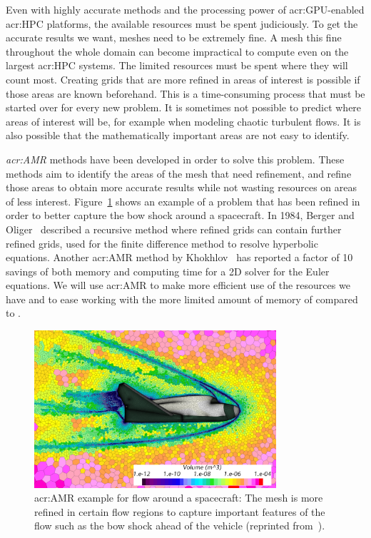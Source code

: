 Even with highly accurate methods and the processing power of \acrshort{acr:GPU}-enabled
\acrshort{acr:HPC} platforms, the available resources must be spent judiciously. To get the accurate
results we want, meshes need to be extremely fine. A mesh this fine throughout the whole domain can
become impractical to compute even on the largest \acrshort{acr:HPC} systems. The limited resources
must be spent where they will count most. Creating grids that are more refined in areas of interest
is possible if those areas are known beforehand. This is a time-consuming process that must be
started over for every new problem. It is sometimes not possible to predict where areas of interest
will be, for example when modeling chaotic turbulent flows. It is also possible that the
mathematically important areas are not easy to identify. 

\textit{\Acrfull{acr:AMR}} methods have been developed in order to solve this problem. These methods
aim to identify the areas of the mesh that need refinement, and refine those areas to obtain more
accurate results while not wasting resources on areas of less interest. Figure~\ref{fig:intro_amr}
shows an example of a problem that has been refined in order to better capture the bow shock around
a spacecraft. In 1984, Berger and Oliger~\cite{Berger1984} described a recursive method where
refined grids can contain further refined grids, used for the finite difference method to resolve
hyperbolic equations. Another \acrshort{acr:AMR} method by Khokhlov~\cite{Khokhlov1998} has reported
a factor of 10 savings of both memory and computing time for a 2D solver for the Euler equations. We
will use \acrlong{acr:AMR} to make more efficient use of the resources we have and to ease working
with the more limited amount of memory of  compared to .

\begin{figure}[H]
	\centering
	\includegraphics[width=0.8\textwidth]{Chapter_introduction/media/adaptive_mesh_refinement}
	\caption{\Acrlong{acr:AMR} example for flow around a spacecraft: The mesh is more refined in certain flow regions to capture important features of the flow such as the bow shock ahead of the vehicle (reprinted from~\cite{Siemens2020}).}\label{fig:intro_amr}
\end{figure}


